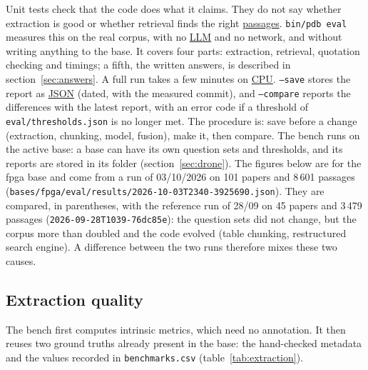 \documentclass[11pt,a4paper]{article}
\newcommand{\cmd}[1]{\texttt{#1}}
\newcommand{\gl}[2]{\hyperlink{gl:#1}{\textcolor{glcolor}{#2}}}
\begin{document}
Unit tests check that the code does what it claims. They do not say whether extraction is
good or whether retrieval finds the right \gl{passage}{passages}. \cmd{bin/pdb eval} measures this on the
real corpus, with no \gl{LLM}{LLM} and no network, and without writing anything to the base. It covers
four parts: extraction, retrieval, quotation checking and timings; a fifth, the written
answers, is described in section~\ref{sec:answers}.
A full run takes a few minutes on \gl{CPU}{CPU}. \cmd{--save} stores the report as \gl{JSON}{JSON} (dated, with the
measured commit), and \cmd{--compare} reports the differences with the latest report, with an
error code if a threshold of \cmd{eval/thresholds.json} is no longer met. The procedure is:
save before a change (extraction, chunking, model, fusion), make it, then compare. The bench
runs on the active base: a base can have its own question sets and thresholds, and its
reports are stored in its folder (section~\ref{sec:drone}). The figures below are for the
fpga base and come from a run of 03/10/2026 on 101 papers and 8\,601 passages
(\cmd{bases/fpga/eval/results/2026-10-03T2340-3925690.json}). They are compared, in
parentheses, with the reference run of 28/09 on 45 papers and 3\,479 passages
(\cmd{2026-09-28T1039-76dc85e}): the question sets did not change, but the corpus more than
doubled and the code evolved (table chunking, restructured search engine). A difference
between the two runs therefore mixes these two causes.

\subsection{Extraction quality}

The bench first computes intrinsic metrics, which need no annotation. It then reuses two
ground truths already present in the base: the hand-checked metadata and the values
recorded in \cmd{benchmarks.csv} (table~\ref{tab:extraction}).
\end{document}
